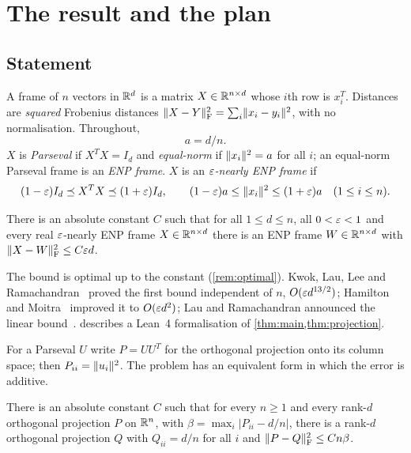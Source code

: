 \section{The result and the plan}\label{sec:intro}

\subsection{Statement}
A frame of $n$ vectors in $\mathbb R^d$ is a matrix $X\in\mathbb R^{n\times d}$ whose $i$th
row is $x_i^T$. Distances are \emph{squared} Frobenius distances
$\lVert X-Y\rVert_{\mathrm F}^2=\sum_i\lVert x_i-y_i\rVert^2$, with no normalisation. Throughout,
\[
 a=d/n .
\]
$X$ is \emph{Parseval} if $X^TX=I_d$ and \emph{equal-norm} if
$\lVert x_i\rVert^2=a$ for all $i$; an equal-norm Parseval frame is an \emph{ENP frame}.
$X$ is an \emph{$\varepsilon$-nearly ENP frame} if
\begin{equation}\label{eq:nearly}
 (1-\varepsilon)I_d\preceq X^TX\preceq(1+\varepsilon)I_d,
 \qquad (1-\varepsilon)a\le\lVert x_i\rVert^2\le(1+\varepsilon)a\quad(1\le i\le n).
\end{equation}

\begin{theorem}\label{thm:main}
There is an absolute constant $C$ such that for all $1\le d\le n$, all
$0<\varepsilon<1$ and every real $\varepsilon$-nearly ENP frame $X\in\mathbb R^{n\times d}$ there is
an ENP frame $W\in\mathbb R^{n\times d}$ with $\lVert X-W\rVert_{\mathrm F}^2\le C\varepsilon d$.
\end{theorem}

The bound is optimal up to the constant (\cref{rem:optimal}). Kwok, Lau, Lee and
Ramachandran~\cite{KLLR} proved the first bound independent of $n$,
$O(\varepsilon d^{13/2})$; Hamilton and Moitra~\cite{HM} improved it to
$O(\varepsilon d^2)$; Lau and Ramachandran announced the linear bound~\cite{LR}.
 describes a Lean~4 formalisation of
\cref{thm:main,thm:projection}.

For a Parseval $U$ write $P=UU^T$ for the orthogonal projection onto its column
space; then $P_{ii}=\lVert u_i\rVert^2$. The problem has an equivalent form in which
the error is additive.

\begin{theorem}\label{thm:projection}
There is an absolute constant $C$ such that for every $n\ge1$ and every
rank-$d$ orthogonal projection $P$ on $\mathbb R^n$, with
$\beta=\max_i|P_{ii}-d/n|$, there is a rank-$d$ orthogonal projection $Q$ with
$Q_{ii}=d/n$ for all $i$ and $\lVert P-Q\rVert_{\mathrm F}^2\le Cn\beta$.
\end{theorem}

